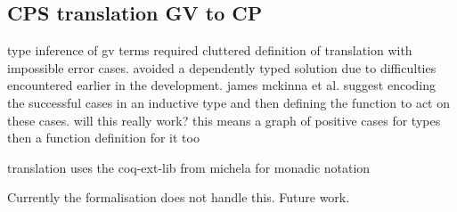 \subsection{CPS translation GV to CP}

type inference of gv terms required cluttered definition of translation with
impossible error cases. avoided a dependently typed solution due to
difficulties encountered earlier in the development. james mckinna et
al. suggest encoding the successful cases in an inductive type and then
defining the function to act on these cases. will this really work? this means
a graph of positive cases for types then a function definition for it too

translation uses the coq-ext-lib from michela for monadic notation

Currently the formalisation does not handle this. Future work.
